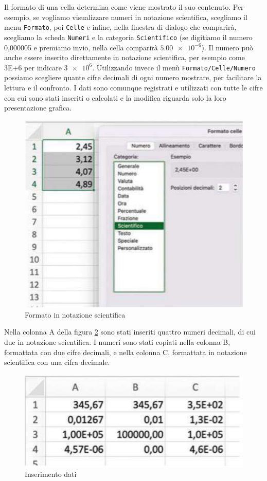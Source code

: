 \documentclass[12pt,a4paper,oneside]{book}
\theoremstyle{esercizio}
\begin{document}
Il formato di una cella determina come viene mostrato il suo contenuto.
 Per esempio, se vogliamo visualizzare numeri in notazione scientifica, scegliamo
  il menu \texttt{Formato}, poi \texttt{Celle} e infine, nella finestra di dialogo che comparirà, 
  scegliamo la scheda \texttt{Numeri} e la categoria \texttt{Scientifico} 
  (se digitiamo il numero 0,000005 e premiamo invio, 
  nella cella comparirà $\num{5,00e-6}$).
  Il numero può anche essere inserito direttamente in notazione scientifica,
   per esempio come 3E+6 per indicare $\num{3e+6}$.
  Utilizzando invece il menù \texttt{Formato/Celle/Numero} possiamo scegliere
   quante cifre decimali di ogni numero mostrare, per facilitare
    la lettura e il confronto. I dati sono comunque registrati e utilizzati 
    con tutte le cifre con cui sono stati inseriti o calcolati e 
    la modifica riguarda solo la loro presentazione grafica.
  \begin{figure}[h!]
    \centering
    \includegraphics[scale=0.4]{img/formato-cella.png} 
    \caption{Formato in notazione scientifica}
    \label{fig:formatocella}
\end{figure} 

Nella colonna A della figura \ref{fig:insdati} sono stati inseriti quattro numeri decimali, di cui due in notazione scientifica. I numeri sono stati copiati nella colonna B, formattata con due cifre decimali, 
e nella colonna C, formattata in notazione scientifica con una cifra decimale.
\begin{figure}[h!]
    \centering
    \includegraphics[scale=0.4]{img/inserimento-dati.png} 
    \caption{Inserimento dati}
    \label{fig:insdati}
\end{figure}
\end{document}

